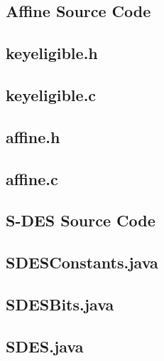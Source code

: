 \documentclass[]{article}
\begin{document}
\vspace*{-0.8cm}
\begin{center}
	\section*{Affine Source Code}
\end{center}

\subsection*{keyeligible.h}
\pagebreak{}
\subsection*{keyeligible.c}
\pagebreak{}
\subsection*{affine.h}
\pagebreak{}
\subsection*{affine.c}
\pagebreak{}


\vspace*{-0.8cm}
\begin{center}
	\section*{S-DES Source Code}
 \end{center}

\subsection*{SDESConstants.java}
\pagebreak{}
\subsection*{SDESBits.java}
\pagebreak{}
\subsection*{SDES.java}
\pagebreak{}

\end{document}
